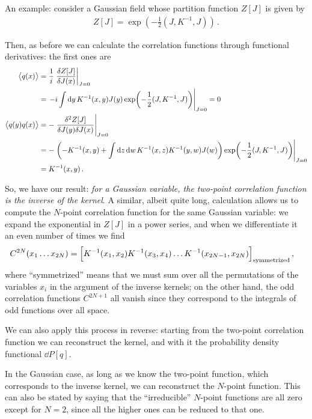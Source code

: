 \documentclass[main.tex]{subfiles}
\begin{document}

An example: consider a Gaussian field whose partition function \(Z[J]\) is given by 
%
\begin{align}
Z[J] = \exp( - \frac{1}{2} (J, K^{-1}, J))
\,.
\end{align}

Then, as before we can calculate the correlation functions through functional derivatives: the first ones are 
%
\begin{align}
\expval{q(x)} &= \frac{1}{i} \eval{\fdv{Z[J]}{J(x)}}_{J=0}  \\
&= \eval{-i \int \dd{y} K^{-1}(x, y) J(y) \exp(- \frac{1}{2} (J, K^{-1}, J))}_{J =0} =0\\
\expval{q(y)q(x)} &= -\eval{\frac{ \delta^2 Z[J]}{ \delta  J(y) \delta  J (x)}}_{J=0} \\
&= -\eval{\qty(-K^{-1}(x, y) + \int \dd{z} \dd{w} K^{-1} (x, z)K^{-1} (y, w) J(w))\exp(- \frac{1}{2} (J, K^{-1}, J))}_{J =0}  \\
&= K^{-1} (x, y)
\,.
\end{align}

So, we have our result: \emph{for a Gaussian variable, the two-point correlation function is the inverse of the kernel}. 
A similar, albeit quite long, calculation allows us to compute the \(N\)-point correlation function for the same Gaussian variable: we expand the exponential in \(Z[J]\) in a power series, and when we differentiate it an even number of times we find  
%
\begin{align}
C^{2N}(x_1 \dots x_{2N}) &= \qty[K^{-1}(x_1, x_2 ) K^{-1} (x_3, x_4) \dots K^{-1} (x_{2N-1}, x_{2N})]_{\text{symmetrized}}
\,,
\end{align}
%
where ``symmetrized'' means that we must sum over all the permutations of the variables \(x_i\) in the argument of the inverse kernels; on the other hand, the odd correlation functions \(C^{2N+1}\) all vanish since they correspond to the integrals of odd functions over all space.

We can also apply this process in reverse: starting from the two-point correlation function we can reconstruct the kernel, and with it the probability density functional \(\dd{P}[q]\). 

In the Gaussian case, as long as we know the two-point function, which corresponds to the inverse kernel, we can reconstruct the \(N\)-point function. 
This can also be stated by saying that the ``irreducible'' \(N\)-point functions are all zero except for \(N=2\), since all the higher ones can be reduced to that one. 
\end{document}
